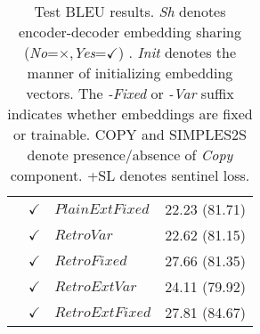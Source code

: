 \begin{table}
\begin{tabular}{|l|l|l|l| }
 & $\checkmark$ & $PlainExtFixed$  & 22.23 (81.71) \\
 & $\checkmark$ & $RetroVar$ &  22.62 (81.15) \\ 
 & $\checkmark$ & $RetroFixed$ &  27.66 (81.35) \\
 & $\checkmark$ & $RetroExtVar$  & 24.11 (79.92) \\ 
 & $\checkmark$ & $RetroExtFixed$  & 27.81 (84.67) \\
 \hline 
\end{tabular}
\caption{Test BLEU results. \emph{Sh} denotes encoder-decoder embedding sharing (\textit{No}=$\times$,\textit{Yes}=$\checkmark$) . \emph{Init} denotes the manner of initializing embedding vectors. The \emph{-Fixed} or \emph{-Var} suffix indicates whether embeddings are fixed or trainable. \textsc{COPY} and \textsc{SIMPLES2S} denote presence/absence of \textit{Copy} component. \textsc{+SL} denotes sentinel loss.}
\textbf{\label{tab:knightExp}}
\end{table}


